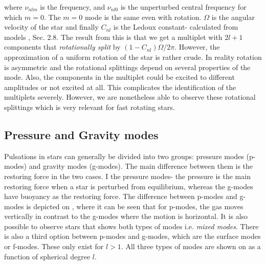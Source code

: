 \noindent where $\nu_{nlm}$ is the frequency, and $\nu_{nl0}$ is the unperturbed central frequency for which $m=0$. The $m=0$ mode is the same even with rotation. $\Omega$ is the angular velocity of the star and finally $C_{nl}$ is the Ledoux constant- calculated from models \citep{aerts2010}, Sec. 2.8. The result from this is that we get a multiplet with $2l+1$ components that \textit{rotationally split} by $(1-C_{nl})\Omega/2\pi$. However, the approximation of a uniform rotation of the star is rather crude. In reality rotation is asymmetric and the rotational splittings depend on several properties of the mode. Also, the components in the multiplet could be excited to different amplitudes or not excited at all. This complicates the identification of the multiplets severely. However, we are nonetheless able to observe these rotational splittings which is very relevant for fast rotating stars. 

\subsection{Pressure and Gravity modes}

Pulsations in stars can generally be divided into two groups: pressure modes (p-modes) and gravity modes (g-modes). The main difference between them is the restoring force in the two cases. I the pressure modes- the pressure is the main restoring force when a star is perturbed from equilibrium, whereas the g-modes have buoyancy as the restoring force. The difference between p-modes and g-modes is depicted on , where it can be seen that for p-modes, the gas moves vertically in contrast to the g-modes where the motion is horizontal. It is also possible to observe stars that shows both types of modes i.e. \textit{mixed modes}. There is also a third option between p-modes and g-modes, which are the surface modes or f-modes. These only exist for $l>1$. All three types of modes are shown on  as a function of spherical degree $l$. 

